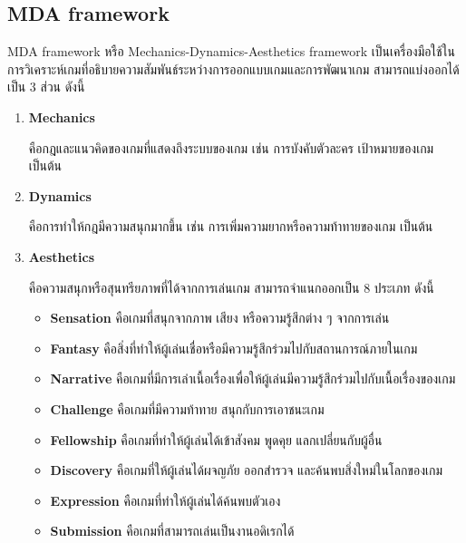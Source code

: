 \documentclass[12pt,oneside,openright,a4paper]{cpe-thai-project}
\begin{document}
\pagebreak
\subsection{MDA framework \cite{mda04}}
MDA framework หรือ Mechanics-Dynamics-Aesthetics framework 
เป็นเครื่องมือใช้ในการวิเคราะห์เกมที่อธิบายความสัมพันธ์ระหว่างการออกแบบเกมและการพัฒนาเกม 
สามารถแบ่งออกได้เป็น 3 ส่วน ดังนี้ 
\begin{enumerate}
  \item \textbf{Mechanics}
  
    คือกฎและแนวคิดของเกมที่แสดงถึงระบบของเกม เช่น การบังคับตัวละคร เป้าหมายของเกม เป็นต้น

  \item \textbf{Dynamics}
  
    คือการทำให้กฎมีความสนุกมากขึ้น เช่น การเพิ่มความยากหรือความท้าทายของเกม เป็นต้น

  \item \textbf{Aesthetics}
  
    คือความสนุกหรือสุนทรียภาพที่ได้จากการเล่นเกม สามารถจำแนกออกเป็น 8 ประเภท ดังนี้

  \begin{itemize}
    \item \textbf{Sensation} คือเกมที่สนุกจากภาพ เสียง หรือความรู้สึกต่าง ๆ จากการเล่น
    \item \textbf{Fantasy} คือสิ่งที่ทำให้ผู้เล่นเชื่อหรือมีความรู้สึกร่วมไปกับสถานการณ์ภายในเกม
    \item \textbf{Narrative} คือเกมที่มีการเล่าเนื้อเรื่องเพื่อให้ผู้เล่นมีความรู้สึกร่วมไปกับเนื้อเรื่องของเกม
    \item \textbf{Challenge} คือเกมที่มีความท้าทาย สนุกกับการเอาชนะเกม
    \item \textbf{Fellowship} คือเกมที่ทำให้ผู้เล่นได้เข้าสังคม พูดคุย แลกเปลี่ยนกับผู้อื่น
    \item \textbf{Discovery} คือเกมที่ให้ผู้เล่นได้ผจญภัย ออกสำรวจ และค้นพบสิ่งใหม่ในโลกของเกม
    \item \textbf{Expression} คือเกมที่ทำให้ผู้เล่นได้ค้นพบตัวเอง
    \item \textbf{Submission} คือเกมที่สามารถเล่นเป็นงานอดิเรกได้
  \end{itemize}
\end{enumerate}
\end{document}
